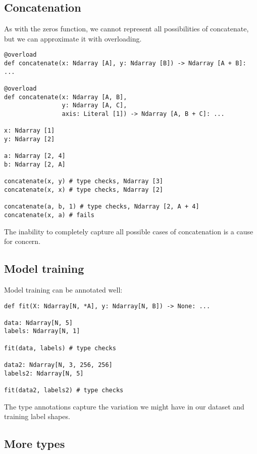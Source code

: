 \documentclass{report}
\begin{document}
\subsection{Concatenation}
As with the zeros function, we cannot represent all possibilities of concatenate, but we can approximate it with overloading.

\begin{singlespace*}
    \begin{verbatim}
@overload
def concatenate(x: Ndarray [A], y: Ndarray [B]) -> Ndarray [A + B]: ...

@overload
def concatenate(x: Ndarray [A, B],
                y: Ndarray [A, C],
                axis: Literal [1]) -> Ndarray [A, B + C]: ...

x: Ndarray [1]
y: Ndarray [2]

a: Ndarray [2, 4]
b: Ndarray [2, A]

concatenate(x, y) # type checks, Ndarray [3]
concatenate(x, x) # type checks, Ndarray [2]

concatenate(a, b, 1) # type checks, Ndarray [2, A + 4]
concatenate(x, a) # fails\end{verbatim}
\end{singlespace*}
The inability to completely capture all possible cases of concatenation is a cause for concern.

\subsection{Model training}
Model training can be annotated well:
\begin{singlespace*}
    \begin{verbatim}
def fit(X: Ndarray[N, *A], y: Ndarray[N, B]) -> None: ...

data: Ndarray[N, 5]
labels: Ndarray[N, 1]

fit(data, labels) # type checks

data2: Ndarray[N, 3, 256, 256]
labels2: Ndarray[N, 5]

fit(data2, labels2) # type checks\end{verbatim}
\end{singlespace*}
The type annotations capture the variation we might have in our dataset and training label shapes.

\subsection{More types}
\end{document}
